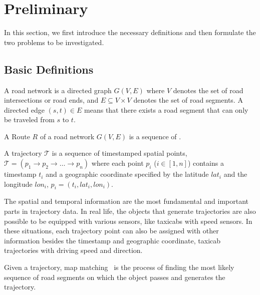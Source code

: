 \section{Preliminary}
\label{sec-preliminary}

In this section, we first introduce the necessary definitions %
and then formulate the two problems to be investigated.

\subsection{Basic Definitions}
\label{subsec-definition}

\begin{definition}A road network is a directed graph $G(V, E)$ where $V$ denotes the set of road intersections or road ends, and $E\subseteq V\times V$ denotes the set of road segments. A directed edge $(s, t)\in E$ %
means that there exists a road segment that can only be traveled from $s$ to $t$.
\end{definition}


\begin{definition}[Route]A Route $R$ of a road network $G(V, E)$ is a sequence of .
\end{definition}


\begin{definition}[Trajectory]A trajectory $\mathcal{T}$ is a sequence of timestamped spatial points, $\mathcal{T} = (p_1 \rightarrow p_2 \rightarrow \dots \rightarrow p_n)$ where each point $p_i$ ($i\in[1,n]$) contains a timestamp $t_i$ and a geographic coordinate specified by the latitude $lat_i$ and the longitude $lon_i$, \ie $p_i=(t_i,lat_i,lon_i)$.
\end{definition}

The spatial and temporal information are the most fundamental and important parts in trajectory data. In real life, the objects that generate trajectories are also possible to be equipped with various sensors, like taxicabs with speed sensors. In these situations, each trajectory point can also be assigned with other information besides the timestamp and geographic coordinate, \eg taxicab trajectories with driving speed and direction.


\begin{definition}Given a trajectory, map matching~\cite{Newson2009MM,WuMSZZCWKDD16} is the process of finding the most likely sequence of road segments on which the object passes and generates the trajectory.
\end{definition}

